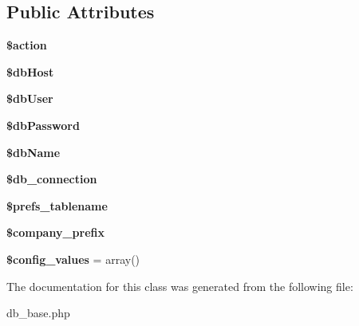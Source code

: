 \subsection*{Public Attributes}
\begin{DoxyCompactItemize}
\item 
\hypertarget{classdb__base_a93af3de7f4288cdaf4a93cf1a8346085}{}\label{classdb__base_a93af3de7f4288cdaf4a93cf1a8346085} 
{\bfseries \$action}
\item 
\hypertarget{classdb__base_a7f1a3b2b14bc10eb673b3d0af56c3ee8}{}\label{classdb__base_a7f1a3b2b14bc10eb673b3d0af56c3ee8} 
{\bfseries \$db\+Host}
\item 
\hypertarget{classdb__base_a91395f456512c60b45499333f68b6a5c}{}\label{classdb__base_a91395f456512c60b45499333f68b6a5c} 
{\bfseries \$db\+User}
\item 
\hypertarget{classdb__base_aa0007ef524573d9a528c890ce289cc4e}{}\label{classdb__base_aa0007ef524573d9a528c890ce289cc4e} 
{\bfseries \$db\+Password}
\item 
\hypertarget{classdb__base_a81c3704aa5baa99effce9ea1ea423004}{}\label{classdb__base_a81c3704aa5baa99effce9ea1ea423004} 
{\bfseries \$db\+Name}
\item 
\hypertarget{classdb__base_a4d95987ff0bee3f6ef2152dab61cc244}{}\label{classdb__base_a4d95987ff0bee3f6ef2152dab61cc244} 
{\bfseries \$db\+\_\+connection}
\item 
\hypertarget{classdb__base_a4e4705dfe4cb60dc20e0ddea4a0a9abe}{}\label{classdb__base_a4e4705dfe4cb60dc20e0ddea4a0a9abe} 
{\bfseries \$prefs\+\_\+tablename}
\item 
\hypertarget{classdb__base_acba5582a357f2d49ebff58acef7315eb}{}\label{classdb__base_acba5582a357f2d49ebff58acef7315eb} 
{\bfseries \$company\+\_\+prefix}
\item 
\hypertarget{classdb__base_a58f6e9e463292fa91f92a40060b11fe6}{}\label{classdb__base_a58f6e9e463292fa91f92a40060b11fe6} 
{\bfseries \$config\+\_\+values} = array()
\end{DoxyCompactItemize}


The documentation for this class was generated from the following file\+:\begin{DoxyCompactItemize}
\item 
db\+\_\+base.\+php\end{DoxyCompactItemize}
